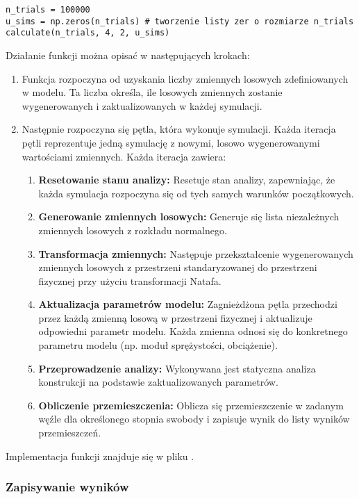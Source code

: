 \begin{lstlisting}
n_trials = 100000
u_sims = np.zeros(n_trials) # tworzenie listy zer o rozmiarze n_trials
calculate(n_trials, 4, 2, u_sims)
\end{lstlisting}
Działanie funkcji można opisać w następujących krokach:

\begin{enumerate}
    \item Funkcja rozpoczyna od uzyskania liczby zmiennych losowych zdefiniowanych w modelu. Ta liczba określa, ile losowych zmiennych zostanie wygenerowanych i zaktualizowanych w każdej symulacji.
    \item Następnie rozpoczyna się pętla, która wykonuje  symulacji. Każda iteracja pętli reprezentuje jedną symulację z nowymi, losowo wygenerowanymi wartościami zmiennych. Każda iteracja zawiera:
    \begin{enumerate}
        \item \textbf{Resetowanie stanu analizy:} Resetuje stan analizy, zapewniając, że każda symulacja rozpoczyna się od tych samych warunków początkowych.
        \item \textbf{Generowanie zmiennych losowych:} Generuje się lista niezależnych zmiennych losowych z rozkładu normalnego.
        \item \textbf{Transformacja zmiennych:} Następuje przekształcenie wygenerowanych zmiennych losowych z przestrzeni standaryzowanej do przestrzeni fizycznej przy użyciu transformacji Natafa.
        \item \textbf{Aktualizacja parametrów modelu:} Zagnieżdżona pętla przechodzi przez każdą zmienną losową w przestrzeni fizycznej i aktualizuje odpowiedni parametr modelu. Każda zmienna odnosi się do konkretnego parametru modelu (np. moduł sprężystości, obciążenie).
        \item \textbf{Przeprowadzenie analizy:} Wykonywana jest statyczna analiza konstrukcji na podstawie zaktualizowanych parametrów.
        \item \textbf{Obliczenie przemieszczenia:} Oblicza się przemieszczenie w zadanym węźle dla określonego stopnia swobody i zapisuje wynik do listy wyników przemieszczeń.
    \end{enumerate}
\end{enumerate}
Implementacja funkcji znajduje się w pliku .

\subsubsection*{Zapisywanie wyników}

